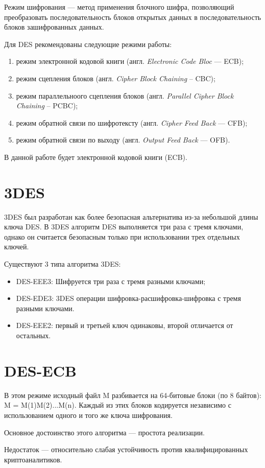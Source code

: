Режим шифрования --- метод применения блочного шифра, позволяющий преобразовать последовательность блоков открытых данных в последовательность блоков зашифрованных данных.

Для DES рекомендованы следующие режими работы:
\begin{enumerate}[label=\arabic*)]
	\item режим электронной кодовой книги (англ. \textit{Electronic Code Bloc} --- ECB);
	\item режим сцепления блоков (англ. \textit{Cipher Block Chaining} -- CBC);
	\item режим параллельноого сцепления блоков (англ. \textit{Parallel Cipher Block Chaining} -- PCBC);
	\item режим обратной связи по шифротексту (англ. \textit{Cipher Feed Back} --- CFB);
	\item режим обратной связи по выходу (англ. \textit{Output Feed Back} --- OFB).
\end{enumerate}

В данной работе будет электронной кодовой книги (ECB).

\section{3DES}

3DES был разработан как более безопасная альтернатива из-за небольшой длины ключа DES. 
В 3DES алгоритм DES выполняется три раза с тремя ключами, однако он считается безопасным только при использовании трех отдельных ключей.

Существуют 3 типа алгоритма 3DES:
\begin{itemize}
	\item DES-EEE3: Шифруется три раза с тремя разными ключами;
	\item DES-EDE3: 3DES операции шифровка-расшифровка-шифровка с тремя разными ключами.
	\item DES-EEE2: первый и третьей ключ одинаковы, второй отличается от остальных.
\end{itemize}

\section{DES-ECB}

В этом режиме исходный файл M разбивается на 64-битовые блоки (по 8 байтов): M = M(1)M(2)...M(n). Каждый из этих блоков кодируется независимо с использованием одного и того же ключа шифрования. 

Основное достоинство этого алгоритма --- простота реализации. 

Недостаток --- относительно слабая устойчивость против квалифицированных криптоаналитиков.

